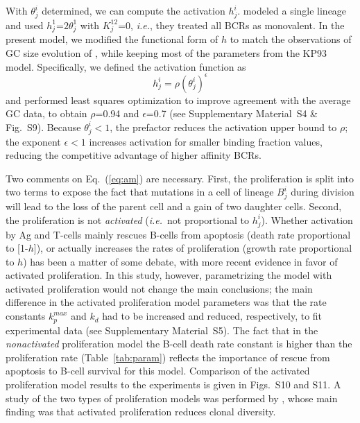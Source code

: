 \documentclass[utf8]{frontiersHLTH}%
\def\ie {{\it i.e.}}
\newcommand{\eq}[1] {Eq.~(\ref{eq:#1})}
\newcommand{\figs}[2]{Figs.~\ref{fig:#1} and~\ref{fig:#2}}
\newcommand{\tab}[1]{Table~\ref{tab:#1}}
\newcommand{\SI}{Supplementary Material}
\begin{document}
With $\theta_j^i$ determined, we can compute the activation $h^i_j$. \citet{kepler93}
modeled a single lineage and used $h^1_j$=$2\theta^1_j$ with $K^{12}_j$=0, \ie,
they treated all BCRs as monovalent. In the present model, we modified
the functional form of $h$ to match the observations of
GC size evolution of \citet{wittenbrink11}, while keeping most of the
parameters from the KP93 model\cite{kepler93}. Specifically,
we defined the activation function as
\begin{equation}
 h^i_j=\rho(\theta^i_j)^{\epsilon}
 \label{eq:act}
\end{equation}
and performed least squares optimization to improve agreement with the average GC data\cite{wittenbrink11}, to obtain
$\rho$=0.94 and $\epsilon$=0.7 (see \SI~S4 \& Fig.~S9).
Because $\theta^i_j<1$, the prefactor reduces the activation upper bound to $\rho$; the exponent $\epsilon<1$ increases
activation for smaller binding fraction values, reducing the competitive advantage of higher affinity BCRs.

Two comments on \eq{am} are necessary. First, the proliferation is split
into two terms\cite{kepler93} to expose the fact that mutations in a cell
of lineage $B^i_j$ during division will lead to the loss of the parent cell
and a gain of two daughter cells.
Second, the
proliferation is not \textit{activated} (\ie~not proportional to $h^i_j$).
Whether activation by Ag and T-cells mainly rescues B-cells
from apoptosis (death rate proportional to
[1-$h$]),\cite{anderson09,zhang10} or actually increases the rates of
proliferation (growth rate proportional to $h$) has been a
matter of some debate, with more recent evidence in favor of activated
proliferation.\cite{gitlin15} In this study, however, parametrizing the model
with activated proliferation would not change the main conclusions;
the main difference in the activated proliferation model parameters was that the rate constants
$k_p^{max}$ and $k_d$ had to be increased and reduced, respectively, to fit experimental data (see \SI~S5). The fact that
in the \textit{nonactivated} proliferation model the B-cell death rate constant is higher than the proliferation rate (\tab{param})
reflects the importance of rescue from apoptosis to B-cell survival for this model.
Comparison of the activated proliferation model results to the
experiments\cite{wittenbrink11,weisel16} is given in Figs.~S10 and S11. %
A study of the two types of proliferation models was performed by \citet{amitai17},
whose main finding was that activated proliferation reduces clonal
diversity.
\end{document}
